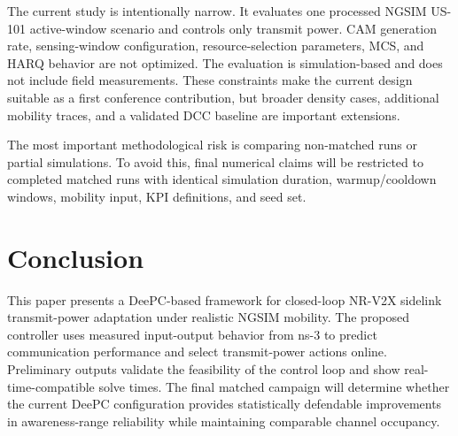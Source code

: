 \documentclass[conference]{IEEEtran}
\begin{document}
The current study is intentionally narrow. It evaluates one processed NGSIM US-101 active-window scenario and controls only transmit power. CAM generation rate, sensing-window configuration, resource-selection parameters, MCS, and HARQ behavior are not optimized. The evaluation is simulation-based and does not include field measurements. These constraints make the current design suitable as a first conference contribution, but broader density cases, additional mobility traces, and a validated DCC baseline are important extensions.

The most important methodological risk is comparing non-matched runs or partial simulations. To avoid this, final numerical claims will be restricted to completed matched runs with identical simulation duration, warmup/cooldown windows, mobility input, KPI definitions, and seed set.

\section{Conclusion}

This paper presents a DeePC-based framework for closed-loop NR-V2X sidelink transmit-power adaptation under realistic NGSIM mobility. The proposed controller uses measured input-output behavior from ns-3 to predict communication performance and select transmit-power actions online. Preliminary outputs validate the feasibility of the control loop and show real-time-compatible solve times. The final matched campaign will determine whether the current DeePC configuration provides statistically defendable improvements in awareness-range reliability while maintaining comparable channel occupancy.



\end{document}
